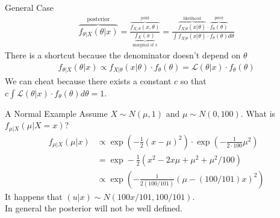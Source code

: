 \documentclass[aspectratio=169]{beamer}
\begin{document}
\begin{frame}{General Case}
\begin{align*}
\overbrace{f_{\theta|X}(\theta | x)}^{\text{posterior}}=\frac{\overbrace{f_{X, \theta}(x, \theta)}^{\text{joint}}}{ \underbrace{f_{X}(x)}_{\text{marginal of } x}}
=\frac{\overbrace{f_{X|\theta}(x | \theta)}^{\text{likelihood}} \cdot  \overbrace{f_{\theta}(\theta)}^{\text{prior}}}{\int f_{X|\theta}(x | \theta) \cdot f_{\theta}(\theta) d \theta}
\end{align*}
There is a shortcut because the denominator doesn't depend on $\theta$
\begin{align*}
f_{\theta|X}(\theta | x) \propto f_{X|\theta}(x | \theta) \cdot f_{\theta}(\theta)=\mathcal{L}(\theta | x) \cdot f_{\theta}(\theta)
\end{align*}
We can cheat because there exists a constant $c$ so that $c \int \mathcal{L}(\theta | x) \cdot f_{\theta}(\theta) d \theta=1$.
\end{frame}

\begin{frame}{A Normal Example}
Assume $X \sim N(\mu,1)$ and $\mu \sim N(0,100)$. What is $f_{\mu | X}(\mu | X=x)$?
\begin{align*}
f_{\mu|X}(\mu | x) &\propto \exp \left(-\frac{1}{2}(x-\mu)^{2}\right) \cdot \exp \left(-\frac{1}{2 \cdot 100} \mu^{2}\right)\\
&=\exp -\frac{1}{2} (x^{2}-2 x \mu+\mu^{2}+\mu^{2} / 100) \\
&\propto \exp \left(-\frac{1}{2(100 / 101)}(\mu-(100 / 101) x)^{2}\right)
\end{align*}
It happens that $(u | x) \sim N(100x/101 , 100/101)$. \\
In general the posterior will not be well defined.
\end{frame}
\end{document}
